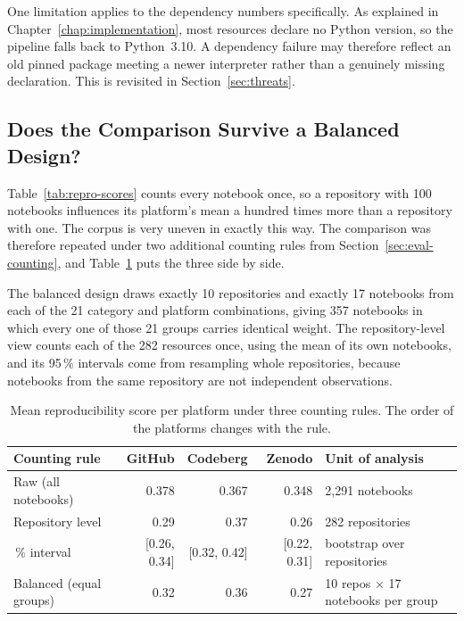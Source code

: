 One limitation applies to the dependency numbers specifically. As explained in Chapter~\ref{chap:implementation}, most resources declare no Python version, so the pipeline falls back to Python~3.10. A dependency failure may therefore reflect an old pinned package meeting a newer interpreter rather than a genuinely missing declaration. This is revisited in Section~\ref{sec:threats}.

\subsection{Does the Comparison Survive a Balanced Design?}
\label{sec:eval-balanced}

Table~\ref{tab:repro-scores} counts every notebook once, so a repository with 100 notebooks influences its platform's mean a hundred times more than a repository with one. The corpus is very uneven in exactly this way. The comparison was therefore repeated under two additional counting rules from Section~\ref{sec:eval-counting}, and Table~\ref{tab:repro-balanced} puts the three side by side.

The balanced design draws exactly 10 repositories and exactly 17 notebooks from each of the 21 category and platform combinations, giving 357 notebooks in which every one of those 21 groups carries identical weight. The repository-level view counts each of the 282 resources once, using the mean of its own notebooks, and its 95\,\% intervals come from resampling whole repositories, because notebooks from the same repository are not independent observations.

\begin{table}[htbp]
\centering
\caption{Mean reproducibility score per platform under three counting rules. The order of the platforms changes with the rule.}
\label{tab:repro-balanced}
\small
\begin{tabularx}{\textwidth}{@{}>{\raggedright\arraybackslash}p{3.4cm} r r r X@{}}
\toprule
Counting rule & GitHub & Codeberg & Zenodo & Unit of analysis\tabularnewline
\midrule
Raw (all notebooks) & 0.378 & 0.367 & 0.348 & 2{,}291 notebooks\tabularnewline
Repository level & 0.29 & 0.37 & 0.26 & 282 repositories\tabularnewline
95\,\% interval & [0.26, 0.34] & [0.32, 0.42] & [0.22, 0.31] & bootstrap over repositories\tabularnewline
Balanced (equal groups) & 0.32 & 0.36 & 0.27 & 10 repos $\times$ 17 notebooks per group\tabularnewline
\bottomrule
\end{tabularx}
\end{table}

